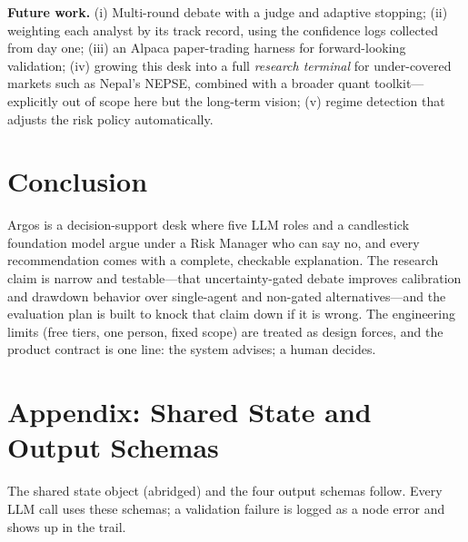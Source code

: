 \documentclass[conference]{IEEEtran}
\newcommand{\sys}{Argos}
\begin{document}
\textbf{Future work.} (i) Multi-round debate with a judge and adaptive stopping; (ii) weighting each analyst by its track record, using the confidence logs collected from day one; (iii) an Alpaca paper-trading harness for forward-looking validation; (iv) growing this desk into a full \emph{research terminal} for under-covered markets such as Nepal's NEPSE, combined with a broader quant toolkit---explicitly out of scope here but the long-term vision; (v) regime detection that adjusts the risk policy automatically.

\section{Conclusion}

\sys{} is a decision-support desk where five LLM roles and a candlestick foundation model argue under a Risk Manager who can say no, and every recommendation comes with a complete, checkable explanation. The research claim is narrow and testable---that uncertainty-gated debate improves calibration and drawdown behavior over single-agent and non-gated alternatives---and the evaluation plan is built to knock that claim down if it is wrong. The engineering limits (free tiers, one person, fixed scope) are treated as design forces, and the product contract is one line: the system advises; a human decides.

\appendix
\section{Appendix: Shared State and Output Schemas}
\label{app:schemas}

The shared state object (abridged) and the four output schemas follow. Every LLM call uses these schemas; a validation failure is logged as a node error and shows up in the trail.
\end{document}
